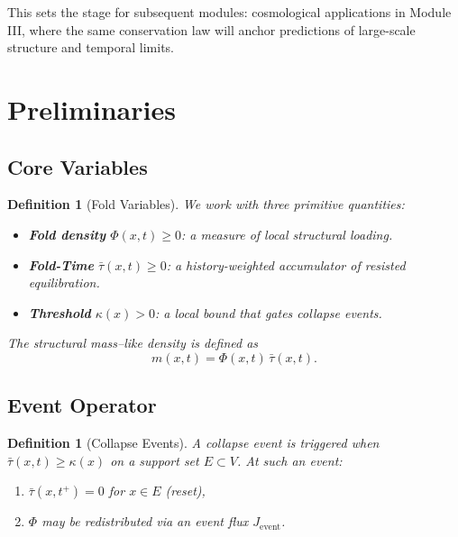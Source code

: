 \documentclass[11pt]{article}
\newtheorem{definition}[theorem]{Definition}
\begin{document}
This sets the stage for subsequent modules: cosmological applications in Module III, where the same conservation law will anchor predictions of large-scale structure and temporal limits.

\section{Preliminaries}

\subsection{Core Variables}
\begin{definition}[Fold Variables]
We work with three primitive quantities:
\begin{itemize}[leftmargin=*]
    \item \textbf{Fold density} $\Phi(x,t) \geq 0$: a measure of local structural loading.
    \item \textbf{Fold-Time} $\bar{\tau}(x,t) \geq 0$: a history-weighted accumulator of resisted equilibration.
    \item \textbf{Threshold} $\kappa(x) > 0$: a local bound that gates collapse events.
\end{itemize}
The \emph{structural mass--like density} is defined as
\[
m(x,t) = \Phi(x,t)\,\bar{\tau}(x,t).
\]
\end{definition}

\subsection{Event Operator}
\begin{definition}[Collapse Events]
A collapse event is triggered when $\bar{\tau}(x,t) \geq \kappa(x)$ on a support set $E \subset V$. 
At such an event:
\begin{enumerate}[leftmargin=*]
    \item $\bar{\tau}(x,t^+) = 0$ for $x \in E$ (reset),
    \item $\Phi$ may be redistributed via an event flux $J_{\text{event}}$.
\end{enumerate}
\end{definition}
\end{document}
